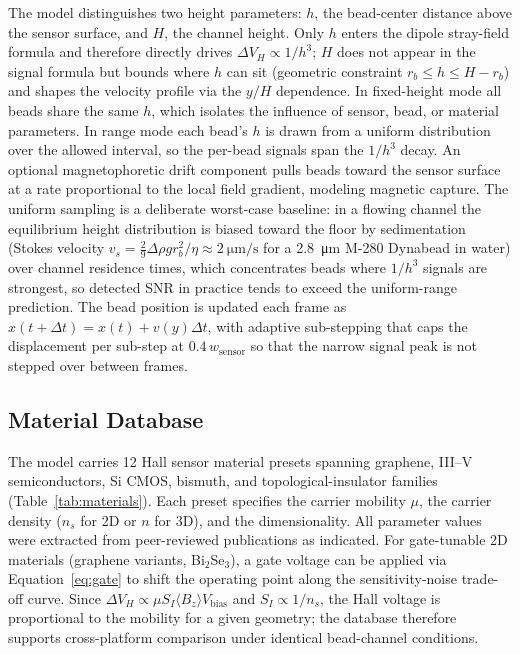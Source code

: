 \documentclass[micromachines,article,submit,pdftex,moreauthors]{Definitions/mdpi}
\begin{document}
The model distinguishes two height parameters: $h$, the bead-center distance above
the sensor surface, and $H$, the channel height. Only $h$ enters the dipole
stray-field formula and therefore directly drives $\Delta V_H \propto 1/h^3$; $H$
does not appear in the signal formula but bounds where $h$ can sit (geometric
constraint $r_b \le h \le H - r_b$) and shapes the velocity profile via the $y/H$
dependence. In fixed-height mode all beads share the same $h$, which isolates the
influence of sensor, bead, or material parameters. In range mode each bead's $h$ is
drawn from a uniform distribution over the allowed interval, so the per-bead signals
span the $1/h^3$ decay. An optional magnetophoretic drift component pulls beads
toward the sensor surface at a rate proportional to the local field gradient,
modeling magnetic capture. The uniform sampling is a deliberate worst-case baseline:
in a flowing channel the equilibrium height distribution is biased toward the floor
by sedimentation (Stokes velocity
$v_s = \tfrac{2}{9}\Delta\rho g r_b^2/\eta \approx \SI{2}{\micro\meter\per\second}$
for a \SI{2.8}{\micro\meter} M-280 Dynabead in water) over channel residence times,
which concentrates beads where $1/h^3$ signals are strongest, so detected SNR in
practice tends to exceed the uniform-range prediction. The bead position is updated
each frame as $x(t + \Delta t) = x(t) + v(y)\Delta t$, with adaptive sub-stepping
that caps the displacement per sub-step at $0.4\,w_\text{sensor}$ so that the narrow
signal peak is not stepped over between frames.

\subsection{Material Database}
\label{sec:materials}

The model carries 12 Hall sensor material presets spanning graphene, III--V
semiconductors, Si CMOS, bismuth, and topological-insulator families
(Table~\ref{tab:materials}). Each preset specifies the carrier mobility $\mu$, the
carrier density ($n_s$ for 2D or $n$ for 3D), and the dimensionality. All parameter
values were extracted from peer-reviewed publications as indicated. For gate-tunable
2D materials (graphene variants, Bi$_2$Se$_3$), a gate voltage can be applied via
Equation~\eqref{eq:gate} to shift the operating point along the sensitivity-noise
trade-off curve. Since $\Delta V_H \propto \mu S_I \langle B_z\rangle V_{\text{bias}}$
and $S_I \propto 1/n_s$, the Hall voltage is proportional to the mobility for a given
geometry; the database therefore supports cross-platform comparison under identical
bead-channel conditions.
\end{document}
